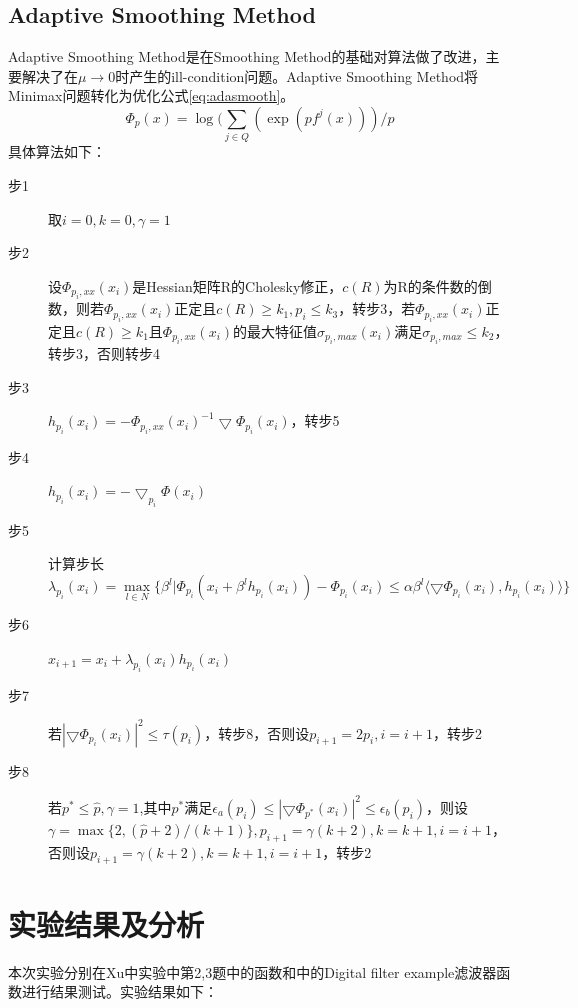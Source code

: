 \documentclass{ctexart}
\begin{document}
\subsection{Adaptive Smoothing Method}
Adaptive Smoothing Method是在Smoothing Method的基础对算法做了改进，主要解决了在$\mu\rightarrow 0$时产生的ill-condition问题。Adaptive Smoothing Method将Minimax问题转化为优化公式\ref{eq:adasmooth}。
\begin{equation}
\label{eq:adasmooth}
\Phi_p(x)=\log(\sum_{j\in Q}{(\exp(pf^j(x)))/p}
\end{equation}
具体算法如下：
\begin{description}
	\item[步1] 取$i=0,k=0,\gamma = 1$
	\item[步2] 设$\Phi_{p_i,xx}(x_i)$是Hessian矩阵R的Cholesky修正，$c(R)$为R的条件数的倒数，则若$\Phi_{p_i,xx}(x_i)$正定且$c(R)\geq k_1,p_i\leq k_3$，转步3，若$\Phi_{p_i,xx}(x_i)$正定且$c(R)\geq k_1$且$\Phi_{p_i,xx}(x_i)$的最大特征值$\sigma_{p_i,max}(x_i)$满足$\sigma_{p_i,max}\leq k_2$，转步3，否则转步4
	\item[步3] $h_{p_i}(x_i) = -\Phi_{p_i,xx}(x_i)^{-1}\bigtriangledown\Phi_{p_i}(x_i)$，转步5
	\item[步4] $h_{p_i}(x_i) = -\bigtriangledown_{p_i}\Phi(x_i)$
	\item[步5] 计算步长\\
	\[\lambda_{p_i}(x_i) = \max_{l\in N}\{\beta^l|\Phi_{p_i}(x_i+\beta^lh_{p_i}(x_i))-\Phi_{p_i}(x_i)\leq \alpha\beta^l\langle\bigtriangledown\Phi_{p_i}(x_i),h_{p_i}(x_i)\rangle\}\]
\item[步6] $x_{i+1} = x_i + \lambda_{p_i}(x_i)h_{p_i}(x_i)$
\item[步7] 若$|\bigtriangledown\Phi_{p_i}(x_i)|^2\leq \tau(p_i)$，转步8，否则设$p_{i+1}=2p_i, i=i+1$，转步2
\item[步8] 若$p^*\leq \hat{p},\gamma=1$,其中$p^*$满足$\epsilon_a(p_i)\leq |\bigtriangledown\Phi_{p^*}(x_i)|^2\leq \epsilon_b(p_i)$，则设$\gamma=\max\{2,(\hat{p}+2)/(k+1)\}, p_{i+1}=\gamma(k+2),k=k+1, i=i+1$，否则设$p_{i+1}=\gamma(k+2),k=k+1,i=i+1$，转步2
\end{description}
\section{实验结果及分析}
本次实验分别在Xu\cite{Xu2001}中实验中第2,3题中的函数和\cite{Charalambous1979}中的Digital filter example滤波器函数进行结果测试。实验结果如下：
\end{document}
